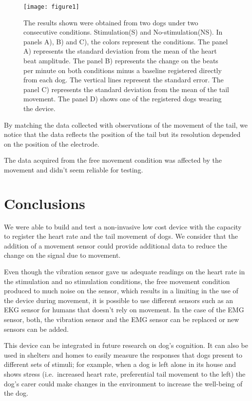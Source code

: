 \documentclass[twocolumn]{bmcart}%
\begin{document}
\begin{figure}[h!]
  \texttt{[image: figure1]}
  \caption{\label{centfig}
The results shown were obtained from two dogs under two consecutive conditions. Stimulation(S) and No-stimulation(NS). In panels A), B) and C), the colors represent the conditions. The panel A) represents the standard deviation from the mean of the heart beat amplitude. The panel B) represents the change on the beats per minute on both conditions minus a baseline registered directly from each dog. The vertical lines represent the standard error. The panel C) represents the standard deviation from the mean of the tail movement. The panel D) shows one of the registered dogs wearing the device.
}
\end{figure}

By matching the data collected with observations of the movement of the
tail, we notice that the data reflects the position of the tail but its
resolution depended on the position of the electrode.

The data acquired from the free movement condition was affected by the
movement and didn't seem reliable for testing.

\section{Conclusions}\label{conclusions}

We were able to build and test a non-invasive low cost device with the
capacity to register the heart rate and the tail movement of dogs. We
consider that the addition of a movement sensor could provide additional
data to reduce the change on the signal due to movement.

Even though the vibration sensor gave us adequate readings on the heart
rate in the stimulation and no stimulation conditions, the free movement
condition produced to much noise on the sensor, which results in a
limiting in the use of the device during movement, it is possible to use
different sensors such as an EKG sensor for humans that doesn't rely on
movement. In the case of the EMG sensor, both, the vibration sensor and
the EMG sensor can be replaced or new sensors can be added.

This device can be integrated in future research on dog's cognition. It
can also be used in shelters and homes to easily measure the responses
that dogs present to different sets of stimuli; for example, when a dog
is left alone in its house and shows stress (i.e.~increased heart rate,
preferential tail movement to the left) the dog's carer could make
changes in the environment to increase the well-being of the dog.
\end{document}
